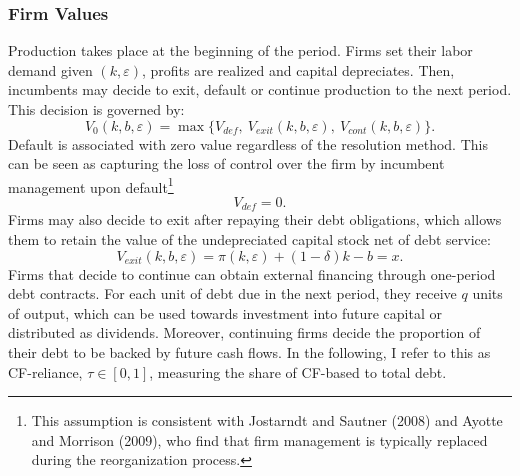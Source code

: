 \documentclass[12pt]{article}
\begin{document}
\subsubsection{Firm Values} \label{sec:Firm Values}
Production takes place at the beginning of the period. Firms set their labor demand given $(k,\varepsilon)$, profits are realized and capital depreciates. Then, incumbents may decide to exit, default or continue production to the next period. This decision is governed by: 
\begin{equation} \label{eq:default decision}
 V_0(k,b,\varepsilon) = \max \{V_{def}, \  V_{exit}(k,b,\varepsilon), \ V_{cont}(k,b,\varepsilon) \}.
\end{equation}
Default is associated with zero value regardless of the resolution method. This can be seen as capturing the loss of control over the firm by incumbent management upon default\footnote{This assumption is consistent with Jostarndt and Sautner (2008) and Ayotte and Morrison (2009), who find that firm management is typically replaced during the reorganization process.} 
\begin{equation}
 V_{def} = 0.
\end{equation}
Firms may also decide to exit after repaying their debt obligations, which allows them to retain the value of the undepreciated capital stock net of debt service: 
\begin{equation}
    V_{exit}(k, b, \varepsilon) = \pi(k,\varepsilon) + (1-\delta)k - b  = x.
\end{equation}
Firms that decide to continue can obtain external financing through one-period debt contracts. For each unit of debt due in the next period, they receive $q$ units of output, which can be used towards investment into future capital or distributed as dividends. Moreover, continuing firms decide the proportion of their debt to be backed by future cash flows. In the following, I refer to this as CF-reliance, $\tau \in [0,1]$, measuring the share of CF-based to total debt. 
\end{document}
